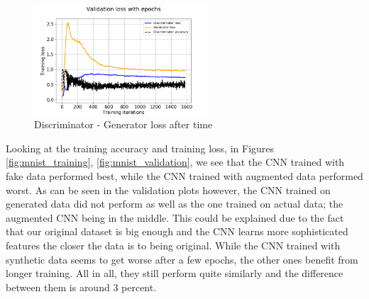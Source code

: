 \documentclass[13pt]{article}
\begin{document}
\begin{figure}[h!]
\centering
\centerline{\includegraphics[width=0.58\textwidth]{plots/mnist/0_loss.png}}
\caption{Discriminator - Generator loss after time}
\label{fig:generated_numbers_loss}
\end{figure}
\newpage
Looking at the training accuracy and training loss, in Figures \ref{fig:mnist_training}, \ref{fig:mnist_validation}, we see that the CNN trained with fake data performed best, while the CNN trained with augmented data performed worst. As can be seen in the validation plots however, the CNN trained on generated data did not perform as well as the one trained on actual data; the augmented CNN being in the middle. This could be explained due to the fact that our original dataset is big enough and the CNN learns more sophisticated features the closer the data is to being original. While the CNN trained with synthetic data seems to get worse after a few epochs, the other ones benefit from longer training. All in all, they still perform quite similarly and the difference between them is around 3 percent.
\end{document}
